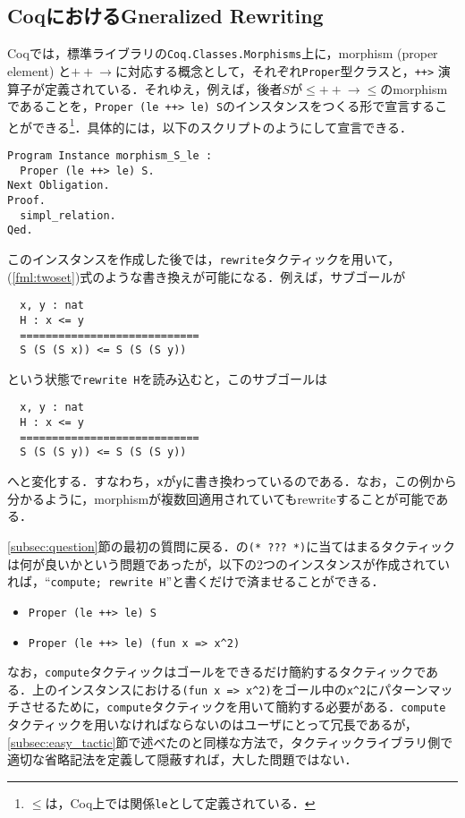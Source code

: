 \documentclass[submit]{ipsj}
\begin{document}
\subsection{CoqにおけるGneralized Rewriting}

Coqでは，標準ライブラリの\verb+Coq.Classes.Morphisms+上に，morphism (proper element) と$\mathrel{{+}\!\!{+}\!\!{\to}}$に対応する概念として，それぞれ\verb+Proper+型クラスと，\verb~++>~ 演算子が定義されている．それゆえ，例えば，後者$S$が${\leq} \mathrel{{+}\!\!{+}\!\!{\to}} {\leq}$のmorphismであることを，\verb~Proper (le ++> le) S~のインスタンスをつくる形で宣言することができる\footnote{$\leq$は，Coq上では関係\texttt{le}として定義されている．}．具体的には，以下のスクリプトのようにして宣言できる．
\begin{mdframed}[leftmargin=10pt, rightmargin=10pt, skipabove=5pt, skipbelow=5pt]
\begin{verbatim}
Program Instance morphism_S_le :
  Proper (le ++> le) S.
Next Obligation.
Proof.
  simpl_relation.
Qed.
\end{verbatim}
\end{mdframed}
このインスタンスを作成した後では，\verb+rewrite+タクティックを用いて，(\ref{fml:twoset})式のような書き換えが可能になる．例えば，サブゴールが
\begin{mdframed}[leftmargin=10pt, rightmargin=10pt, skipabove=5pt, skipbelow=10pt]
\begin{verbatim}
  x, y : nat
  H : x <= y
  ============================
  S (S (S x)) <= S (S (S y))
\end{verbatim}
\end{mdframed}
という状態で\verb+rewrite H+を読み込むと，このサブゴールは
\begin{mdframed}[leftmargin=10pt, rightmargin=10pt, skipabove=5pt, skipbelow=10pt]
\begin{verbatim}
  x, y : nat
  H : x <= y
  ============================
  S (S (S y)) <= S (S (S y))
\end{verbatim}
\end{mdframed}
へと変化する．すなわち，\verb+x+が\verb+y+に書き換わっているのである．なお，この例から分かるように，morphismが複数回適用されていてもrewriteすることが可能である．

\ref{subsec:question}節の最初の質問に戻る．の\verb+(* ??? *)+に当てはまるタクティックは何が良いかという問題であったが，以下の2つのインスタンスが作成されていれば，``\verb+compute; rewrite H+''と書くだけで済ませることができる．
\begin{itemize}
\item \verb~Proper (le ++> le) S~
\item \verb~Proper (le ++> le) (fun x => x^2)~
\end{itemize}
なお，\verb~compute~タクティックはゴールをできるだけ簡約するタクティックである．上のインスタンスにおける\verb~(fun x => x^2)~をゴール中の\verb~x^2~にパターンマッチさせるために，\verb~compute~タクティックを用いて簡約する必要がある．\verb~compute~タクティックを用いなければならないのはユーザにとって冗長であるが，\ref{subsec:easy_tactic}節で述べたのと同様な方法で，タクティックライブラリ側で適切な省略記法を定義して隠蔽すれば，大した問題ではない．
\end{document}
